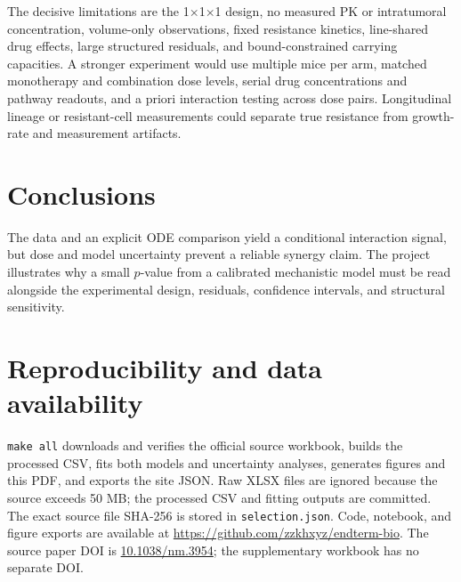 \documentclass[10pt,a4paper]{article}
\begin{document}
The decisive limitations are the 1$\times$1$\times$1 design, no measured PK or intratumoral concentration, volume-only observations, fixed resistance kinetics, line-shared drug effects, large structured residuals, and bound-constrained carrying capacities. A stronger experiment would use multiple mice per arm, matched monotherapy and combination dose levels, serial drug concentrations and pathway readouts, and a priori interaction testing across dose pairs. Longitudinal lineage or resistant-cell measurements could separate true resistance from growth-rate and measurement artifacts.

\section*{Conclusions}
The data and an explicit ODE comparison yield a conditional interaction signal, but dose and model uncertainty prevent a reliable synergy claim. The project illustrates why a small $p$-value from a calibrated mechanistic model must be read alongside the experimental design, residuals, confidence intervals, and structural sensitivity.

\section*{Reproducibility and data availability}
\texttt{make all} downloads and verifies the official source workbook, builds the processed CSV, fits both models and uncertainty analyses, generates figures and this PDF, and exports the site JSON. Raw XLSX files are ignored because the source exceeds 50 MB; the processed CSV and fitting outputs are committed. The exact source file SHA-256 is stored in \texttt{selection.json}. Code, notebook, and figure exports are available at \url{https://github.com/zzkhxyz/endterm-bio}. The source paper DOI is \href{https://doi.org/10.1038/nm.3954}{10.1038/nm.3954}; the supplementary workbook has no separate DOI.
\end{document}
